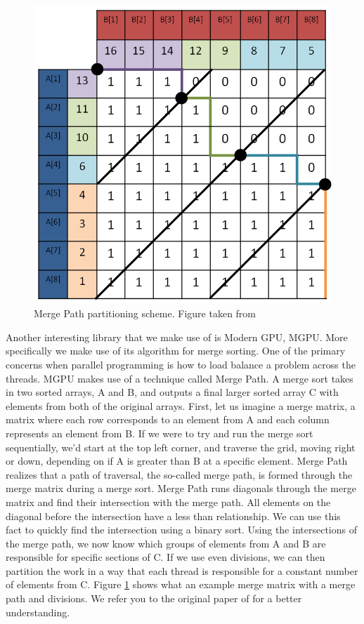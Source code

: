\begin{figure}[ht!]
\centering
\includegraphics[width=1.0\textwidth]{images/MergePath.png}
\caption{Merge Path partitioning scheme. Figure taken from \cite{odeh2012merge}}
\label{fig:mgpu}
\end{figure}

Another interesting library that we make use of is Modern GPU, MGPU.
More specifically we make use of its algorithm for merge sorting.
One of the primary concerns when parallel programming is how to load balance a problem across the threads.
MGPU makes use of a technique called Merge Path.
A merge sort takes in two sorted arrays, A and B, and outputs a final larger sorted array C with elements from both of the original arrays.
First, let us imagine a merge matrix, a matrix where each row corresponds to an element from A and each column represents an element from B.
If we were to try and run the merge sort sequentially, we'd start at the top left corner, and traverse the grid, moving right or down, depending on if A is greater than B at a specific element.
Merge Path realizes that a path of traversal, the so-called merge path, is formed through the merge matrix during a merge sort.
Merge Path runs diagonals through the merge matrix and find their intersection with the merge path.
All elements on the diagonal before the intersection have a less than relationship.
We can use this fact to quickly find the intersection using a binary sort.
Using the intersections of the merge path, we now know which groups of elements from A and B are responsible for specific sections of C.
If we use even divisions, we can then partition the work in a way that each thread is responsible for a constant number of elements from C.
Figure \ref{fig:mgpu} shows what an example merge matrix with a merge path and divisions.
We refer you to the original paper of \cite{odeh2012merge} for a better understanding.

